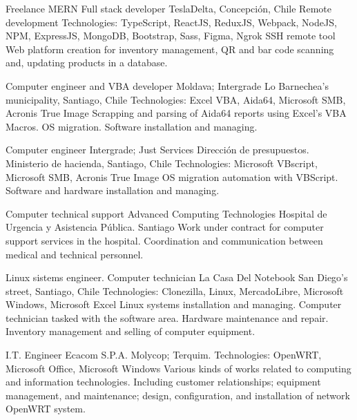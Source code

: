 \documentclass[draft,color,12pt,letterpaper,sans]{moderncv}
\begin{document}
{Freelance MERN Full stack developer}
{TeslaDelta, Concepci\'on, Chile}
{\newline Remote development}
{\newline Technologies: TypeScript, ReactJS, ReduxJS, Webpack, NodeJS, NPM, ExpressJS, MongoDB, Bootstrap, Sass, Figma, Ngrok SSH remote tool}
{Web platform creation for inventory management, QR and bar code scanning and, updating products in a database.\newline}

{Computer engineer and VBA developer}
{Moldava; Intergrade}
{Lo Barnechea's municipality, Santiago, Chile}
{\newline Technologies: Excel VBA, Aida64, Microsoft SMB, Acronis True Image}
{Scrapping and parsing of Aida64 reports using Excel's VBA Macros. OS migration. Software installation and managing.\newline}


{Computer engineer}
{Intergrade; Just Services}
{Direcci\'on de presupuestos. Ministerio de hacienda, Santiago, Chile}
{\newline Technologies: Microsoft VBscript, Microsoft SMB, Acronis True Image}
{OS migration automation with VBScript. Software and hardware installation and managing.\newline}

{Computer technical support}
{Advanced Computing Technologies}
{Hospital de Urgencia y Asistencia P\'ublica. Santiago}
{}
{Work under contract for computer support services in the hospital. Coordination and communication between medical and technical personnel.\newline}

{Linux sistems engineer. Computer technician}
{La Casa Del Notebook}
{San Diego's street, Santiago, Chile}
{\newline Technologies: Clonezilla, Linux, MercadoLibre, Microsoft Windows, Microsoft Excel}
{Linux systems installation and managing. Computer technician tasked with the software area. Hardware maintenance and repair. Inventory management and selling of computer equipment.\newline} 

{I.T. Engineer}
{Ecacom S.P.A.}
{Molycop; Terquim. }
{\newline Technologies: OpenWRT, Microsoft Office, Microsoft Windows}
{Various kinds of works related to computing and information technologies. Including customer relationships; equipment management, and maintenance; design, configuration, and installation of network OpenWRT system.\newline}
\end{document}
